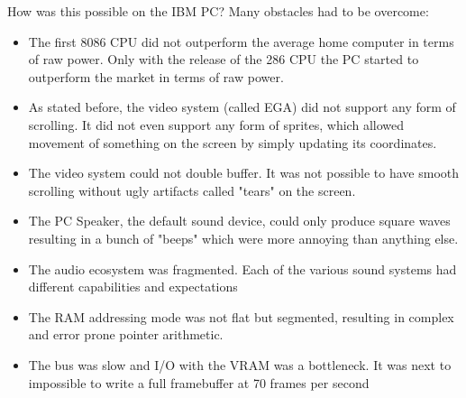 \documentclass[book.tex]{subfiles}
\begin{document}
How was this possible on the IBM PC? Many obstacles had to be overcome:
\begin{itemize}
  \item The first 8086 CPU did not outperform the average home computer in terms of raw power. Only with the release of the 286 CPU the PC started to outperform the market in terms of raw power.
  \item As stated before, the video system (called EGA) did not support any form of scrolling. It did not even support any form of sprites, which allowed movement of something on the screen by simply updating its  coordinates.
  \item The video system could not double buffer. It was not possible to have smooth scrolling without ugly artifacts called "tears" on the screen.
  \item The PC Speaker, the default sound device, could only produce square waves resulting in a bunch of "beeps" which were more annoying than anything else.
  \item The audio ecosystem was fragmented. Each of the various sound systems had
different capabilities and expectations
  \item The RAM addressing mode was not flat but segmented, resulting in complex and
error prone pointer arithmetic.
  \item The bus was slow and I/O with the VRAM was a bottleneck. It was next to impossible to write a full framebuffer at 70 frames per second
\end{itemize}
\par


\end{document}

